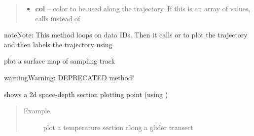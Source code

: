 \documentclass[letterpaper,10pt,english]{sphinxmanual}
\begin{document}
\begin{fulllineitems}
\begin{fulllineitems}
\begin{quote}
\begin{description}
\begin{itemize}
\item {} 
\textbf{col} -- color to be used along the trajectory. If this is an array of values, calls  instead of 

\end{itemize}

\end{description}\end{quote}

\begin{notice}{note}{Note:}
This method loops on data IDs. Then it calls  or  to plot the trajectory and then labels the trajectory using 
\end{notice}

\end{fulllineitems}


\begin{fulllineitems}
\label{altimetry.data:altimetry.data.hydro_data.plot_track_old}
plot a surface map of sampling track

\begin{notice}{warning}{Warning:}
DEPRECATED method!
\end{notice}

\end{fulllineitems}


\begin{fulllineitems}
\label{altimetry.data:altimetry.data.hydro_data.plot_transect}
shows a 2d space-depth section plotting point (using )
\begin{quote}\begin{description}
\item[{Example }] \leavevmode
plot a temperature section along a glider transect

\end{description}\end{quote}


\end{fulllineitems}
\end{fulllineitems}
\end{document}
